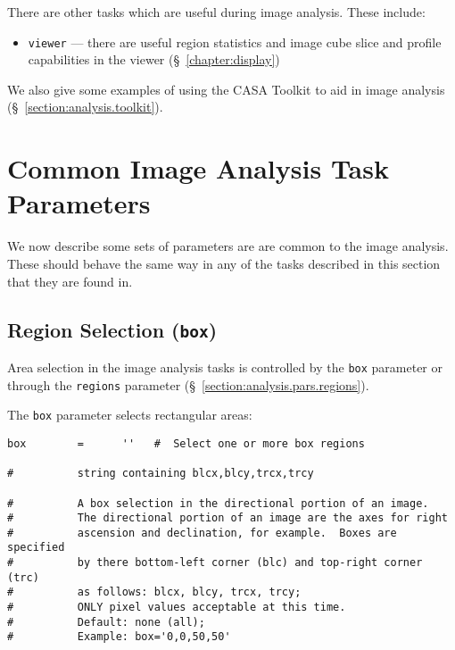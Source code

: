 There are other tasks which are useful during image analysis.  These
include:
\begin{itemize}
   \item {\tt viewer} --- there are useful region statistics and
         image cube slice and profile capabilities in the viewer 
         (\S~\ref{chapter:display})
\end{itemize}

We also give some examples of using the CASA Toolkit to aid in
image analysis (\S~\ref{section:analysis.toolkit}).

\section{Common Image Analysis Task Parameters}
\label{section:analysis.pars}

We now describe some sets of parameters are are common to the image
analysis.  These should behave the same way in any of the tasks
described in this section that they are found in.  

\subsection{Region Selection ({\tt box})}
\label{section:analysis.pars.box}

Area selection in the image analysis tasks is controlled by
the {\tt box} parameter or through the {\tt regions}
parameter (\S~\ref{section:analysis.pars.regions}).

The {\tt box} parameter selects rectangular areas:
\small
\begin{verbatim}
box        =      ''   #  Select one or more box regions

#          string containing blcx,blcy,trcx,trcy

#          A box selection in the directional portion of an image.
#          The directional portion of an image are the axes for right
#          ascension and declination, for example.  Boxes are specified
#          by there bottom-left corner (blc) and top-right corner (trc)
#          as follows: blcx, blcy, trcx, trcy;
#          ONLY pixel values acceptable at this time.
#          Default: none (all);
#          Example: box='0,0,50,50'


\end{verbatim}
\normalsize

